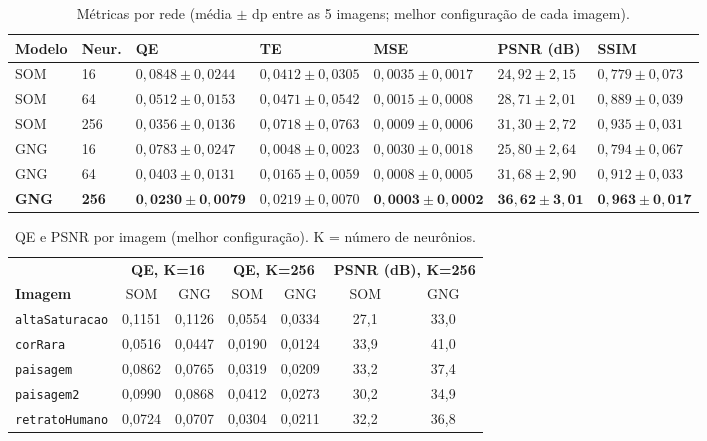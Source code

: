 \documentclass[11pt,a4paper]{article}
\begin{document}
\begin{table}[h]\centering
\small
\caption{Métricas por rede (média $\pm$ dp entre as 5 imagens; melhor configuração de cada imagem).}
\label{tab:resumo}
\begin{tabularx}{\textwidth}{llXXXXX}
\toprule
\textbf{Modelo} & \textbf{Neur.} & \textbf{QE} & \textbf{TE} & \textbf{MSE} & \textbf{PSNR (dB)} & \textbf{SSIM} \\
\midrule
SOM & 16  & $0{,}0848\pm0{,}0244$ & $0{,}0412\pm0{,}0305$ & $0{,}0035\pm0{,}0017$ & $24{,}92\pm2{,}15$ & $0{,}779\pm0{,}073$ \\
SOM & 64  & $0{,}0512\pm0{,}0153$ & $0{,}0471\pm0{,}0542$ & $0{,}0015\pm0{,}0008$ & $28{,}71\pm2{,}01$ & $0{,}889\pm0{,}039$ \\
SOM & 256 & $0{,}0356\pm0{,}0136$ & $0{,}0718\pm0{,}0763$ & $0{,}0009\pm0{,}0006$ & $31{,}30\pm2{,}72$ & $0{,}935\pm0{,}031$ \\
\midrule
GNG & 16  & $0{,}0783\pm0{,}0247$ & $0{,}0048\pm0{,}0023$ & $0{,}0030\pm0{,}0018$ & $25{,}80\pm2{,}64$ & $0{,}794\pm0{,}067$ \\
GNG & 64  & $0{,}0403\pm0{,}0131$ & $0{,}0165\pm0{,}0059$ & $0{,}0008\pm0{,}0005$ & $31{,}68\pm2{,}90$ & $0{,}912\pm0{,}033$ \\
\textbf{GNG} & \textbf{256} & $\mathbf{0{,}0230\pm0{,}0079}$ & $0{,}0219\pm0{,}0070$ & $\mathbf{0{,}0003\pm0{,}0002}$ & $\mathbf{36{,}62\pm3{,}01}$ & $\mathbf{0{,}963\pm0{,}017}$ \\
\bottomrule
\end{tabularx}
\end{table}

\begin{table}[h]\centering
\small
\setlength{\tabcolsep}{5pt}
\caption{QE e PSNR por imagem (melhor configuração). K = número de neurônios.}
\label{tab:porimagem}
\begin{tabular}{lcccccc}
\toprule
 & \multicolumn{2}{c}{\textbf{QE, K=16}} & \multicolumn{2}{c}{\textbf{QE, K=256}} & \multicolumn{2}{c}{\textbf{PSNR (dB), K=256}} \\
\cmidrule(lr){2-3}\cmidrule(lr){4-5}\cmidrule(lr){6-7}
\textbf{Imagem} & SOM & GNG & SOM & GNG & SOM & GNG \\
\midrule
\texttt{altaSaturacao}  & 0,1151 & 0,1126 & 0,0554 & 0,0334 & 27,1 & 33,0 \\
\texttt{corRara}        & 0,0516 & 0,0447 & 0,0190 & 0,0124 & 33,9 & 41,0 \\
\texttt{paisagem}       & 0,0862 & 0,0765 & 0,0319 & 0,0209 & 33,2 & 37,4 \\
\texttt{paisagem2}      & 0,0990 & 0,0868 & 0,0412 & 0,0273 & 30,2 & 34,9 \\
\texttt{retratoHumano}  & 0,0724 & 0,0707 & 0,0304 & 0,0211 & 32,2 & 36,8 \\
\bottomrule
\end{tabular}
\end{table}
\end{document}
